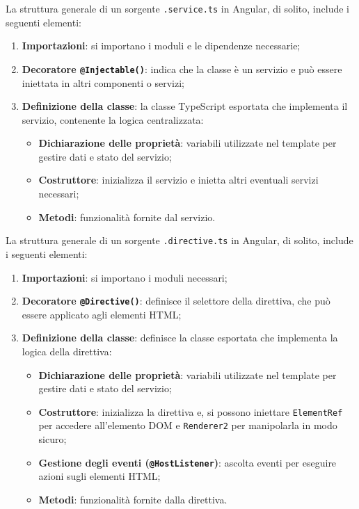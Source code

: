 La struttura generale di un sorgente \texttt{.service.ts} in Angular, di solito, include i seguenti elementi:
\begin{enumerate}
    \item \textbf{Importazioni}: si importano i moduli e le dipendenze necessarie;
    \item \textbf{Decoratore \texttt{@Injectable()}}: indica che la classe è un servizio e può essere iniettata in altri componenti o servizi;
    \item \textbf{Definizione della classe}: la classe TypeScript esportata che implementa il servizio, contenente la logica centralizzata:
    \begin{itemize}
        \item \textbf{Dichiarazione delle proprietà}: variabili utilizzate nel template per gestire dati e stato del servizio;
        \item \textbf{Costruttore}: inizializza il servizio e inietta altri eventuali servizi necessari;
        \item \textbf{Metodi}: funzionalità fornite dal servizio.
    \end{itemize}
\end{enumerate}

La struttura generale di un sorgente \texttt{.directive.ts} in Angular, di solito, include i seguenti elementi:
\begin{enumerate}
    \item \textbf{Importazioni}: si importano i moduli necessari;
    \item \textbf{Decoratore \texttt{@Directive()}}: definisce il selettore della direttiva, che può essere applicato agli elementi HTML;
    \item \textbf{Definizione della classe}: definisce la classe esportata che implementa la logica della direttiva:
    \begin{itemize}
        \item \textbf{Dichiarazione delle proprietà}: variabili utilizzate nel template per gestire dati e stato del servizio;
        \item \textbf{Costruttore}: inizializza la direttiva e, si possono iniettare \texttt{ElementRef} per accedere all'elemento DOM e \texttt{Renderer2} per manipolarla in modo sicuro;
        \item \textbf{Gestione degli eventi (\texttt{@HostListener})}: ascolta eventi per eseguire azioni sugli elementi HTML;
        \item \textbf{Metodi}: funzionalità fornite dalla direttiva.
    \end{itemize}
\end{enumerate}

